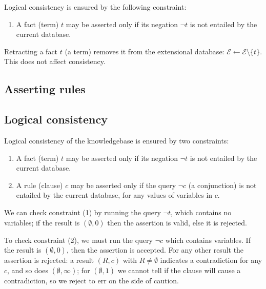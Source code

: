 \documentclass{article}
\theoremstyle{definition}
\newcommand{\edb}{\mathcal{E}}						%
\begin{document}
Logical consistency is ensured by the following constraint:
\begin{enumerate}
	\item A fact (term) $t$ may be asserted only if its negation $\neg t$ is not entailed by the current database.
\end{enumerate}

Retracting a fact $t$ (a term) removes it from the extensional database: $\edb \leftarrow \edb \setminus \{t\}$. This does not affect consistency.



\subsection{Asserting rules}


\subsection{Logical consistency}

Logical consistency of the knowledgebase is ensured by two constraints:
\begin{enumerate}
	\item A fact (term) $t$ may be asserted only if its negation $\neg t$ is not entailed by the current database.
	\item A rule (clause) $c$ may be asserted only if the query $\neg c$ (a conjunction) is not entailed by the current database, for any values of variables in $c$.
\end{enumerate}

We can check constraint (1) by running the query $\neg t$, which contains no variables; if the result is $(\emptyset, 0)$ then the assertion is valid, else it is rejected.


To check constraint (2), we must run the query $\neg c$ which contains variables. If the result is $(\emptyset, 0)$, then the assertion is accepted. For any other result the assertion is rejected: a result $(R, c)$ with $R \neq \emptyset$ indicates a contradiction for any $c$, and so does $(\emptyset, \infty)$; for $(\emptyset, 1)$ we cannot tell if the clause will cause a contradiction, so we reject to err on the side of caution.
\end{document}
